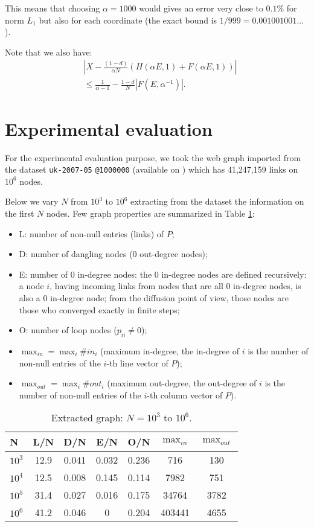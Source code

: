 \documentclass[conference]{IEEEtran}
\begin{document}
\begin{psfrags}
This means that choosing $\alpha=1000$ would gives an error very close to $0.1$\% for norm $L_1$
but also for each coordinate (the exact bound is $1/999=0.001001001...$).

Note that we also have:
\begin{align*}
&\left| X - \frac{(1-d)}{\alpha N}(H(\alpha E,1)+F(\alpha E,1))\right|\\
& \le\frac{1}{\alpha-1} - \frac{1-d}{N}|F(E,\alpha^{-1})|.
\end{align*}


\section{Experimental evaluation}\label{sec:eval}


For the experimental evaluation purpose,
we took the web graph imported from the dataset \verb+uk-2007-05+ \verb+@1000000+
(available on \cite{webgraphit}) which has 41,247,159 links on $10^6$ nodes.

Below we vary $N$ from $10^3$ to $10^6$ extracting from the dataset the
information on the first $N$ nodes.
Few graph properties are summarized in Table \ref{tab:1}:
\begin{itemize}
\item L: number of non-null entries (links) of $P$;
\item D: number of dangling nodes (0 out-degree nodes);
\item E: number of 0 in-degree nodes: the 0 in-degree nodes are defined recursively:
  a node $i$, having incoming links from nodes that are all 0 in-degree nodes, is
  also a 0 in-degree node; from the diffusion point of view, those nodes are those
  who converged exactly in finite steps;
\item O: number of loop nodes ($p_{ii} \neq 0$);
\item $\max_{in} = \max_i \#in_i$ (maximum in-degree, the in-degree of $i$ is the number of
  non-null entries of the $i$-th line vector of $P$);
\item $\max_{out} = \max_i \#out_i$ (maximum out-degree, the out-degree of $i$ is the number of
  non-null entries of the $i$-th column vector of $P$).
\end{itemize}

\begin{table}
\begin{center}
\begin{tabular}{|l|cccccc|}
\hline
N        & L/N  & D/N   & E/N   & O/N & $\max_{in}$ & $\max_{out}$\\
\hline
$10^3$   & 12.9 & 0.041 & 0.032 & 0.236 & 716   & 130\\
$10^4$   & 12.5 & 0.008 & 0.145 & 0.114 & 7982  & 751\\
$10^5$   & 31.4 & 0.027 & 0.016 & 0.175 & 34764 & 3782\\
$10^6$   & 41.2 & 0.046 & 0     & 0.204 & 403441& 4655\\
\hline
\end{tabular}\caption{Extracted graph: $N=10^3$ to $10^6$.}\label{tab:1}
\end{center}
\end{table}


\end{psfrags}
\end{document}
